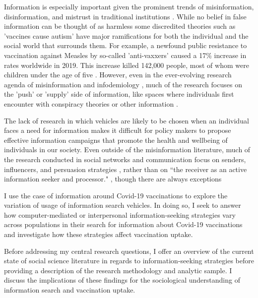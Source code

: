 Information is especially important given the prominent trends of
misinformation, disinformation, and mistrust in traditional institutions
\citep{starbird19, kata10}. While no belief in false information can be thought of as
harmless \citep{douglas21} some discredited theories such as 'vaccines cause autism'
have major ramifications for both the individual and the social world that
surrounds them. For example, a newfound public resistance to vaccination
against Measles by so-called 'anti-vaxxers' caused a 17\% increase in rates
worldwide in 2019. This increase killed  142,000 people, most of whom were
children under the age of five \citep{givetash19}. However, even in the ever-evolving
research agenda of misinformation and infodemiology \citep{eysenbach02}, much of the
research focuses on the 'push' or 'supply' side of information, like spaces where
individuals first encounter with conspiracy theories or other information
\citep{johnsonOnlineCompetitionPro2020, broniatowski_etal20}.

The lack of research in which vehicles are likely to be chosen when an
individual faces a need for information makes it difficult for policy makers to
propose effective information campaigns that promote the health and wellbeing of
individuals in our society. Even outside of the misinformation literature, much
of the research conducted in social networks and communication focus on senders,
influencers, and persuasion strategies 
\citep{mertonManifestLatentFunctions1968, katzPersonalInfluencePart1955, lazarsfeldPeopleChoice1944},
rather than on
“the receiver as an active information seeker and processor." \citep{johnsonComprehensiveModelCancerRelated1993},
though there are always exceptions \citep{eysenbach09}

I use the case of information around Covid-19 vaccinations to explore the
variation of usage of information search vehicles. In doing so, I seek to answer
how computer-mediated or interpersonal information-seeking strategies vary
across populations in their search for information about Covid-19 vaccinations
and investigate how these strategies affect vaccination uptake.

Before addressing my central research questions, I offer an overview of the
current state of social science literature in regards to information-seeking
strategies before providing a description of the research methodology and
analytic sample. I discuss the implications of these findings for the
sociological understanding of information search and vaccination uptake.

